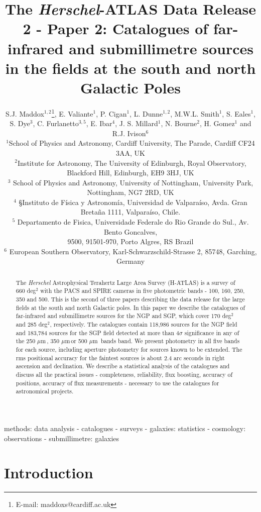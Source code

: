 \documentclass[useAMS,usenatbib]{mnras}
\title[The \textit{Herschel}-ATLAS Data Release 2]{The
  \textit{Herschel}-ATLAS Data Release 2 - Paper 2: Catalogues of
  far-infrared and submillimetre sources in the fields at the south
  and north Galactic Poles}
\author[S.J. Maddox]{S.J. Maddox$^{1,2}$\thanks{E-mail:
    maddoxs@cardiff.ac.uk}, E. Valiante$^1$, P. Cigan$^1$, 
  L. Dunne$^{1,2}$,
  \textsc{}\newauthor M.W.L. Smith$^1$, S. Eales$^1$, S. Dye$^3$,
  C. Furlanetto$^{3,5}$, E. Ibar$^4$, \newauthor
  J. S. Millard$^1$, N. Bourne$^2$, H. Gomez$^1$ and R.J. Ivison$^6$\\
  $^{1}$School of Physics and Astronomy, Cardiff University, The Parade, Cardiff CF24 3AA, UK\\
  $^2$Institute for Astronomy, The University of Edinburgh, Royal
  Observatory, Blackford Hill,
  Edinburgh, EH9 3HJ, UK\\
  $^3$ School of Physics and Astronomy, University of Nottingham,
  University Park, Nottingham,
  NG7 2RD, UK\\
  $^4$ §Instituto de F\'isica y Astronom\'ia, Universidad de Valpara\'iso, Avda. Gran Breta\~na 1111, Valpara\'iso, Chile.\\
  $^5$ Departamento de Fisica, Universidade Federale do Rio Grande do Sul., Av. Bento Goncalves,\\
  9500, 91501-970, Porto Algres, RS Brazil\\
  $^6$ European Southern Observatory, Karl-Schwarzschild-Strasse 2,
  85748, Garching, Germany}
\date{}
\def\mic{ $\mu $m\,}
\begin{document}
\label{firstpage}
\pagerange{\pageref{firstpage}--\pageref{lastpage}}
\maketitle


\begin{abstract}

  The {\it Herschel} Astrophysical Terahertz Large Area Survey
  (H-ATLAS) is a survey of 660 deg$^2$ with the PACS and SPIRE cameras
  in five photometric bands - 100, 160, 250, 350 and 500\micron.  This
  is the second of three papers describing the data release for the
  large fields at the south and north Galactic poles.  In this paper
  we describe the catalogues of far-infrared and submillimetre sources
  for the NGP and SGP, which cover 170 deg$^2$ and 285 deg$^2$,
  respectively.  The catalogues contain 118,986 sources for the NGP
  field and 183,784 sources for the SGP field detected at more than
  4$\sigma$ significance in any of the 250\mic, 350\mic or 500\mic
  bands band. We present photometry in all five bands for each source,
  including aperture photometry for sources known to be extended.  The
  rms positional accuracy for the faintest sources is about 2.4 arc
  seconds in right ascension and declination.  We describe a
  statistical analysis of the catalogues and discuss all the practical
  issues - completeness, reliability, flux boosting, accuracy of
  positions, accuracy of flux measurements - necessary to use the
  catalogues for astronomical projects.
\end{abstract}

\begin{keywords}
methods: data analysis - catalogues - surveys - galaxies: statistics - cosmology:
observations - submillimetre: galaxies
\end{keywords}

\section{Introduction}
\end{document}
